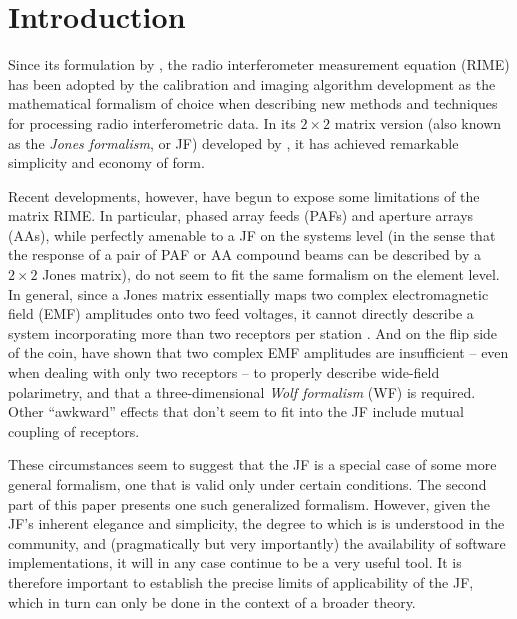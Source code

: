 \documentclass[]{aa}
\newcommand{\EDIT}[1]{#1}
\begin{document}

\maketitle

\section*{Introduction}

Since its formulation by \citet{ME1}, the radio interferometer measurement equation (RIME) has been \EDIT{adopted} by the calibration and imaging algorithm development as the mathematical formalism of choice when describing new methods and techniques for processing radio interferometric data. In its $2\times2$ matrix version (also known as the \emph{Jones formalism\/}, or JF) developed by \citet{ME4}, it has achieved \EDIT{remarkable} simplicity and economy of form. 

Recent developments, however, have begun to expose some limitations of the matrix RIME. In particular, phased array feeds (PAFs) and aperture arrays (AAs), while perfectly amenable to a JF on the systems level (in the sense that the response of a pair of
PAF or AA compound beams can be described by a $2\times2$ Jones matrix), do not seem to fit the same formalism on the element level. In general, since a Jones matrix essentially maps two complex electromagnetic field (EMF) amplitudes onto two feed voltages, it cannot directly describe a system incorporating more than two receptors per station \citep[as in, e.g., the ``tripole'' design of][]{tripole-patent}. And on the flip side of the coin, \citet{Carozzi:ME3D} have shown that two complex EMF amplitudes are insufficient -- even when dealing with only two receptors -- to properly describe wide-field polarimetry, and  that a three-dimensional \emph{Wolf formalism} (WF) is required. Other ``awkward'' effects that don't seem to fit into the JF include mutual coupling of receptors. 

These circumstances seem to suggest that the JF is a special case of some more general formalism, one that is valid only under certain conditions. 
The second part of this paper presents one such generalized formalism. However, given the JF's inherent elegance and simplicity, the degree to which is is understood in the community, and (pragmatically but very importantly) the availability of software implementations, it will in any case 
continue to be a very useful tool. It is therefore important to establish the precise limits of applicability of the JF, which in turn can only be done in the context of a broader theory.
\end{document}
